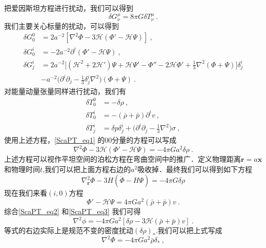 把爱因斯坦方程进行扰动，我们可以得到
\begin{equation}\label{ScaPT_eq1}
\delta G^\mu_\nu = 8 \pi G\delta T^\mu_\nu ~.
\end{equation}
我们主要关心标量的扰动，可以得到
\begin{equation}
\begin{aligned}
\delta G^0_0 & = 2 a^{-2} [\nabla^2 \Phi- 3 \mathcal H(\Phi' - \mathcal H \Psi)] ~,  \\
\delta G^i_0 & = - 2 a^{-2} \partial^i(\Phi' - \mathcal H \Psi)~, \\
\delta G^i_j &= 2 a^{-2} \bigg[ (\mathcal H^2 + 2 \mathcal H')\Psi +\mathcal H \Psi' - \Phi'' - 2 \mathcal H \Phi' + \frac{1}{3} \nabla^2 (\Phi+\Psi)  \bigg] \delta^i_j \\
& - a^{-2} \bigg( \partial^i\partial_j - \frac{1}{3} \delta^i_j \nabla^2 \bigg) (\Phi+\Psi) ~.
\end{aligned}
\end{equation}
对能量动量张量同样进行扰动，我们有
\begin{equation}
\begin{aligned}
\delta T^0_0 & = - \delta \rho~, \\
\delta T^i_0 & = - (\bar \rho +\bar p) \partial^i v~, \\
\delta T^i_j & = \delta p \delta^i_j + \bigg( \partial^i\partial_j - \frac{1}{3} \nabla^2 \bigg) \sigma ~,
\end{aligned}
\end{equation}
使用上述方程，\autoref{ScaPT_eq1} 的00分量的方程可以写成
\begin{equation}\label{ScaPT_eq2}
\nabla^2 \Phi - 3 \mathcal H (\Phi' - \mathcal H\Psi) = - 4 \pi G a^2 \delta \rho~. 
\end{equation}
上述方程可以视作平坦空间的泊松方程在弯曲空间中的推广．定义物理距离$\mathbf r = a \mathbf x$和物理时间$t$,我们可以把上面方程右边的$a^2$吸收掉．最终我们可以得到如下方程
\begin{equation}
\nabla^2_{\mathbf r} \Phi - 3 H (\dot\Phi - H \Psi) = - 4 \pi G \delta \rho
\end{equation}
现在我们来看$(i,0)$方程
\begin{equation}\label{ScaPT_eq3}
\Phi' - \mathcal H \Psi = 4 \pi G a^2 (\bar \rho + \bar p) v ~.
\end{equation}
综合\autoref{ScaPT_eq2} 和\autoref{ScaPT_eq3} 我们可得
\begin{equation}
\nabla^2\phi = - 4 \pi G a^2 [\delta \rho - 3 \mathcal H(\bar\rho+ \bar p) v]~.
\end{equation}
等式的右边实际上是规范不变的密度扰动$(\delta\rho)_*$.我们可以把上式写成
\begin{equation}
\nabla^2\Phi = - 4 \pi G a^2 \bar \rho \delta_* ~,
\end{equation}



